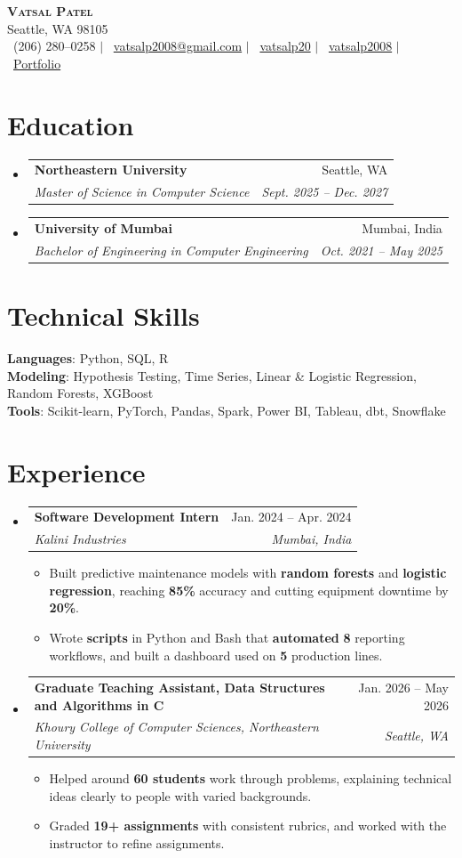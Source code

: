 \documentclass[letterpaper,10.5pt]{article}
\makeatletter
\newcommand{\resumeItem}[1]{\item\small{{#1 \vspace{-2pt}}}}
\newcommand{\resumeSubheading}[4]{\vspace{-2pt}\item\begin{tabular*}{0.97\textwidth}[t]{l@{\extracolsep{\fill}}r}\textbf{#1} & #2 \\\textit{\small#3} & \textit{\small #4} \\\end{tabular*}\vspace{-7pt}}
\newcommand{\resumeSubHeadingListStart}{\begin{itemize}[leftmargin=0.15in, label={}]}
\newcommand{\resumeSubHeadingListEnd}{\end{itemize}}
\newcommand{\resumeItemListStart}{\begin{itemize}}
\newcommand{\resumeItemListEnd}{\end{itemize}\vspace{-5pt}}
\makeatother
\begin{document}
\begin{center}
    \fontsize{20}{24}\selectfont \textbf{\scshape Vatsal Patel} \\[4pt]
    \normalsize Seattle, WA 98105 \\[4pt]
    \small \faPhone*~(206) 280--0258 \quad $|$ \quad \faEnvelope~\href{mailto:vatsalp2008@gmail.com}{vatsalp2008@gmail.com} \quad $|$ \quad \faLinkedin~\href{https://www.linkedin.com/in/vatsalp20/}{vatsalp20} \quad $|$ \quad \faGithub~\href{https://github.com/vatsalp2008}{vatsalp2008} \quad $|$ \quad \faGlobe~\href{https://vatsalp2008.github.io/Portfolio/}{Portfolio}
\end{center}
\section{Education}
\resumeSubHeadingListStart
\resumeSubheading{Northeastern University}{Seattle, WA}{Master of Science in Computer Science}{Sept. 2025 -- Dec. 2027}
\resumeSubheading{University of Mumbai}{Mumbai, India}{Bachelor of Engineering in Computer Engineering}{Oct. 2021 -- May 2025}
\resumeSubHeadingListEnd
\section{Technical Skills}
\begin{itemize}[leftmargin=0.15in, label={}]
\small{\item{\textbf{Languages}{: Python, SQL, R} \\\textbf{Modeling}{: Hypothesis Testing, Time Series, Linear \& Logistic Regression, Random Forests, XGBoost} \\\textbf{Tools}{: Scikit-learn, PyTorch, Pandas, Spark, Power BI, Tableau, dbt, Snowflake}}}
\end{itemize}
\section{Experience}
\resumeSubHeadingListStart
\resumeSubheading{Software Development Intern}{Jan. 2024 -- Apr. 2024}{Kalini Industries}{Mumbai, India}
\resumeItemListStart
\resumeItem{Built predictive maintenance models with \textbf{random forests} and \textbf{logistic regression}, reaching \textbf{85\%} accuracy and cutting equipment downtime by \textbf{20\%}.}
\resumeItem{Wrote \textbf{scripts} in Python and Bash that \textbf{automated} \textbf{8} reporting workflows, and built a dashboard used on \textbf{5} production lines.}
\resumeItemListEnd
\resumeSubheading{Graduate Teaching Assistant, Data Structures and Algorithms in C}{Jan. 2026 -- May 2026}{Khoury College of Computer Sciences, Northeastern University}{Seattle, WA}
\resumeItemListStart
\resumeItem{Helped around \textbf{60 students} work through problems, explaining technical ideas clearly to people with varied backgrounds.}
\resumeItem{Graded \textbf{19+ assignments} with consistent rubrics, and worked with the instructor to refine assignments.}
\resumeItemListEnd
\resumeSubHeadingListEnd
\end{document}
